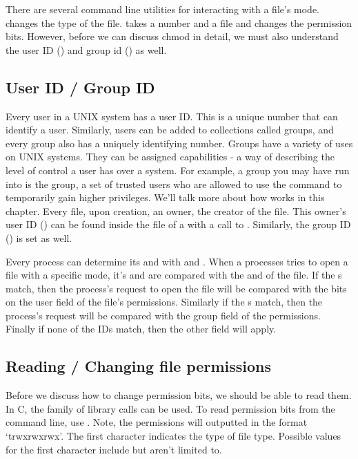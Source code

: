There are several command line utilities for interacting with a file's mode.
 changes the type of the file.
 takes a number and a file and changes the permission bits.
However, before we can discuss chmod in detail, we must also understand the user ID () and group id () as well.

\subsection{User ID / Group ID}

Every user in a UNIX system has a user ID.
This is a unique number that can identify a user.
Similarly, users can be added to collections called groups, and every group also has a uniquely identifying number.
Groups have a variety of uses on UNIX systems.
They can be assigned capabilities - a way of describing the level of control a user has over a system.
For example, a group you may have run into is the  group, a set of trusted users who are allowed to use the command  to temporarily gain higher privileges.
We'll talk more about how  works in this chapter.
Every file, upon creation, an owner, the creator of the file.
This owner's user ID () can be found inside the  file of a  with a call to .
Similarly, the group ID () is set as well.

Every process can determine its  and  with  and .
When a processes tries to open a file with a specific mode, it's  and  are compared with the  and  of the file.
If the s match, then the process's request to open the file will be compared with the bits on the user field of the file's permissions.
Similarly if the s match, then the process's request will be compared with the group field of the permissions.
Finally if none of the IDs match, then the other field will apply.

\subsection{Reading / Changing file permissions}

Before we discuss how to change permission bits, we should be able to read them.
In C, the  family of library calls can be used.
To read permission bits from the command line, use .
Note, the permissions will outputted in the format `trwxrwxrwx'.
The first character indicates the type of file type.
Possible values for the first character include but aren't limited to.

